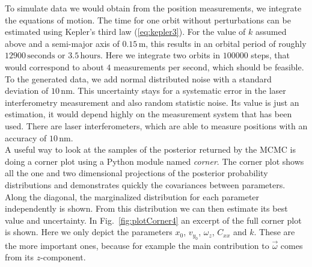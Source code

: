 \documentclass[prb,preprint]{revtex4-1}
\begin{document}
To simulate data we would obtain from the position measurements, we integrate the equations of motion. The time for one orbit without perturbations can be estimated using Kepler's third law (\ref{eq:kepler3}). For the value of $k$ assumed above and a semi-major axis of $0.15 \, \mathrm{m}$, this results in an orbital period of roughly $12900 \, \mathrm{seconds}$ or $3.5 \, \mathrm{hours}$. Here we integrate two orbits in $100000$ steps, that would correspond to about $4$ measurements per second, which should be feasible. To the generated data, we add normal distributed noise with a standard deviation of $10 \, \mathrm{nm}$. This uncertainty stays for a systematic error in the laser interferometry measurement and also random statistic noise. Its value is just an estimation, it would depend highly on the measurement system that has been used. There are laser interferometers, which are able to measure positions with an accuracy of $10\,\mathrm{nm}$.\cite{Loughridge13} \\

A useful way to look at the samples of the posterior returned by the MCMC is doing a corner plot using a Python module named \textit{corner}\cite{corner}. The corner plot shows all the one and two dimensional projections of the posterior probability distributions and demonstrates quickly the covariances between parameters. Along the diagonal, the marginalized distribution for each parameter independently is shown. From this distribution we can then estimate its best value and uncertainty.
In Fig.~\ref{fig:plotCorner4} an excerpt of the full corner plot is shown. Here we only depict the parameters $x_0$, $v_{y_0}$, $\omega_z$, $C_{xx}$ and $k$. These are the more important ones, because for example the main contribution to $\vec{\omega}$ comes from its $z$-component.\\
\end{document}
